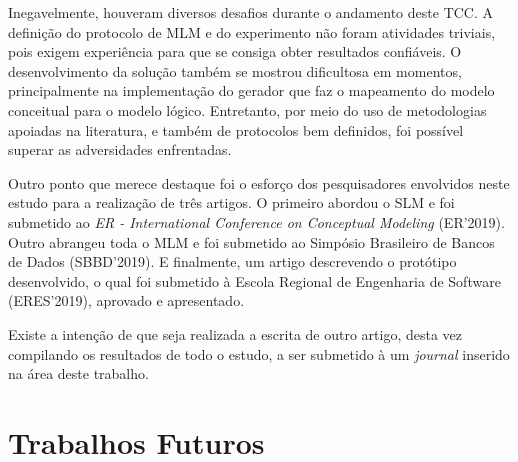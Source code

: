 Inegavelmente, houveram diversos desafios durante o andamento deste \ac{TCC}. 
A definição do protocolo de \ac{MLM} e do experimento não foram atividades triviais, pois exigem experiência para que se consiga obter resultados confiáveis.
O desenvolvimento da solução também se mostrou dificultosa em momentos, principalmente na implementação do gerador que faz o mapeamento do modelo conceitual para o modelo lógico. 
Entretanto, por meio do uso de metodologias apoiadas na literatura, e também de protocolos bem definidos, foi possível superar as adversidades enfrentadas.

Outro ponto que merece destaque foi o esforço dos pesquisadores envolvidos neste estudo para a realização de três artigos.
O primeiro abordou o \ac{SLM} e foi submetido ao \textit{ER - International Conference on Conceptual Modeling} (ER'2019).
Outro abrangeu toda o \ac{MLM} e foi submetido ao Simpósio Brasileiro de Bancos de Dados (SBBD'2019). 
E finalmente, um artigo descrevendo o protótipo desenvolvido, o qual foi submetido à Escola Regional de Engenharia de Software (ERES'2019), aprovado e apresentado.

Existe a intenção de que seja realizada a escrita de outro artigo, desta vez compilando os resultados de todo o estudo, a ser submetido à um \textit{journal} inserido na área deste trabalho.




\section{Trabalhos Futuros}



